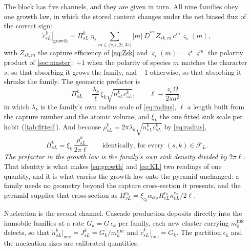 The block has five channels, and they are given in turn. All nine families
obey one growth law, in which the stored
content changes under the net biased flux of the correct sign:
\begin{equation}
  \left.\dot c^k_{sL}\right|_{\mathrm{growth}}
  = \Pi^k_{sL}\;\eta_s\!\!\sum_{m\in\{v,i,2i,3i\}}\!\!
    |m|\;\overline D^{m}\,Z_{sk,m}\,c^{m}\,\varsigma_s(m),
  \label{eq:growth}
\end{equation}
with $Z_{sk,m}$ the capture efficiency of \cref{eq:Zsk} and
$\varsigma_s(m)=\varsigma^{s}\varsigma^{m}$ the polarity product of
\cref{sec:master}: $+1$ when the polarity of species $m$ matches the character
$s$, so that absorbing it grows the family, and $-1$ otherwise, so that
absorbing it shrinks the family. The geometric prefactor is
\begin{equation}
  \Pi^k_{sL}=\frac{\lambda_k}{\ell}\,\xi_k
             \sqrt{n^k_{sL}c^k_{sL}},
  \qquad
  \ell\equiv\frac{z_c\Omega}{2\pi a^{2}},
  \label{eq:loopprefactor}
\end{equation}
in which $\lambda_k$ is the family's own radius scale of \cref{eq:radius},
$\ell$ a length built from the capture number and the atomic volume, and
$\xi_k$ the one fitted sink scale per habit (\cref{tab:fitted}). And because $\rho^k_{sL}=2\pi\lambda_k\sqrt{n^k_{sL}c^k_{sL}}$ by
\cref{eq:radius},
\begin{equation}
  \Pi^k_{sL}=\xi_k\,\frac{\rho^k_{sL}}{2\pi\ell}
  \qquad\text{identically, for every }(s,k)\in\mathcal F_L .
  \label{eq:Pi-identity}
\end{equation}
\emph{The prefactor in the growth law is the family's own sink density divided
by $2\pi\ell$.} That identity is what makes \cref{eq:growth} and \cref{eq:KL}
two readings of one quantity, and it is what carries the growth law onto the
pyramid unchanged: a family needs no geometry beyond the capture cross-section
it presents, and the pyramid supplies that cross-section as
$\Pi^{c_0}_{vL}=\xi_{c_0}\alpha_{\mathrm{sfp}}
R^{c_0}_{vL}n^{c_0}_{vL}/2\ell$.

Nucleation is the second channel. Cascade production deposits directly into the immobile
families at a rate $G_k=G\,\epsilon_k$ per family, each new cluster carrying
$m^{\mathrm{nuc}}_k$ defects, so that
$\dot n^k_{sL}|_{\mathrm{nuc}}=J^k_{sL}=G_k/m^{\mathrm{nuc}}_k$ and
$\dot c^k_{sL}|_{\mathrm{nuc}}=G_k$. The partition $\epsilon_k$ and the
nucleation sizes are calibrated quantities.

